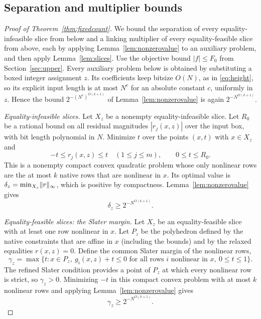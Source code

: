 \subsection{Separation and multiplier bounds}
\begin{proof}[Proof of Theorem~\ref{thm:fixedcount}]
We bound the separation of every equality-infeasible slice from below and
a linking multiplier of every equality-feasible slice from above, each by
applying Lemma~\ref{lem:nonzerovalue} to an auxiliary problem, and then
apply Lemma~\ref{lem:slices}. Use the objective bound $|f|\le F_0$ from
Section~\ref{sec:upper}. Every auxiliary problem below is obtained by
substituting a boxed integer assignment $z$. Its coefficients keep
bitsize $O(N)$, as in \eqref{eq:height}, so its explicit input length is
at most $N^{c}$ for an absolute constant $c$, uniformly in $z$. Hence the bound $2^{-(N^{c})^{O(k+1)}}$ of
Lemma~\ref{lem:nonzerovalue} is again $2^{-N^{O(k+1)}}$.

\emph{Equality-infeasible slices.}
Let $X_z$ be a nonempty equality-infeasible slice. Let $R_0$ be a rational
bound on all residual magnitudes $|r_j(x,z)|$ over the input box, with bit
length polynomial in $N$. Minimize $t$ over the points $(x,t)$ with
$x\in X_z$ and
\[
 -t\le r_j(x,z)\le t\quad(1\le j\le m),\qquad 0\le t\le R_0.
\]
This is a nonempty compact convex quadratic problem whose only nonlinear
rows are the at most $k$ native rows that are nonlinear in $x$. Its
optimal value is $\delta_z=\min_{X_z}\lVert r\rVert_\infty$, which is positive
by compactness. Lemma~\ref{lem:nonzerovalue} gives
\begin{equation}\label{eq:fixedseparation}
 \delta_z\ge2^{-N^{O(k+1)}}.
\end{equation}

\emph{Equality-feasible slices: the Slater margin.}
Let $X_z$ be an equality-feasible slice with at least one row nonlinear
in $x$. Let $P_z$ be the polyhedron defined by the native constraints that
are affine in $x$ (including the bounds) and by the relaxed equalities
$r(x,z)=0$. Define the common Slater margin of the nonlinear rows,
\begin{equation}\label{eq:slatermargin}
 \gamma_z=\max\{t:x\in P_z,\ g_i(x,z)+t\le0
           \text{ for all rows $i$ nonlinear in $x$},\ 0\le t\le1\}.
\end{equation}
The refined Slater condition provides a point of $P_z$ at which every
nonlinear row is strict, so $\gamma_z>0$. Minimizing $-t$ in this compact
convex problem with at most $k$ nonlinear rows and applying
Lemma~\ref{lem:nonzerovalue} gives
\begin{equation}\label{eq:marginbound}
 \gamma_z\ge2^{-N^{O(k+1)}}.
\end{equation}


\end{proof}
